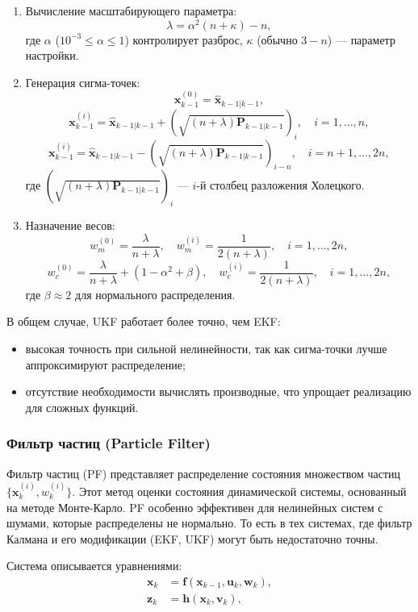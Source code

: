 \begin{enumerate}
    \item Вычисление масштабирующего параметра:
    \[
    \lambda = \alpha^2 (n + \kappa) - n,
    \]
    где \(\alpha\) (\(10^{-3} \leq \alpha \leq 1\)) контролирует разброс, \(\kappa\) (обычно \(3 - n\)) --- параметр настройки.
    \item Генерация сигма-точек:
    \[
    \mathbf{x}_{k-1}^{(0)} = \hat{\mathbf{x}}_{k-1|k-1},
    \]
    \[
    \mathbf{x}_{k-1}^{(i)} = \hat{\mathbf{x}}_{k-1|k-1} + (\sqrt{(n + \lambda) \mathbf{P}_{k-1|k-1}})_i, \quad i = 1, \dots, n,
    \]
    \[
    \mathbf{x}_{k-1}^{(i)} = \hat{\mathbf{x}}_{k-1|k-1} - (\sqrt{(n + \lambda) \mathbf{P}_{k-1|k-1}})_{i-n}, \quad i = n+1, \dots, 2n,
    \]
    где \((\sqrt{(n + \lambda) \mathbf{P}_{k-1|k-1}})_i\) --- \(i\)-й столбец разложения Холецкого.
    \item Назначение весов:
    \[
    w_m^{(0)} = \frac{\lambda}{n + \lambda}, \quad w_m^{(i)} = \frac{1}{2(n + \lambda)}, \quad i = 1, \dots, 2n,
    \]
    \[
    w_c^{(0)} = \frac{\lambda}{n + \lambda} + (1 - \alpha^2 + \beta), \quad w_c^{(i)} = \frac{1}{2(n + \lambda)}, \quad i = 1, \dots, 2n,
    \]
    где \(\beta \approx 2\) для нормального распределения.
\end{enumerate}

В общем случае, UKF работает более точно, чем EKF:
\begin{itemize}
    \item высокая точность при сильной нелинейности, так как сигма-точки лучше аппроксимируют распределение;
    \item отсутствие необходимости вычислять производные, что упрощает реализацию для сложных функций.
\end{itemize}

\subsubsection{Фильтр частиц (Particle Filter)}
\label{particle_filter}

Фильтр частиц (PF) представляет распределение состояния множеством частиц \(\{\mathbf{x}_k^{(i)}, w_k^{(i)}\}\). 
Этот метод оценки состояния динамической системы, основанный на методе Монте-Карло.
PF особенно эффективен для нелинейных систем с шумами, которые распределены не нормально.
То есть в тех системах, где фильтр Калмана и его модификации (EKF, UKF) могут быть недостаточно точны.

Система описывается уравнениями:
\begin{align}
    \mathbf{x}_k &= \mathbf{f}(\mathbf{x}_{k-1}, \mathbf{u}_k, \mathbf{w}_k), \label{eq:pf_state} \\
    \mathbf{z}_k &= \mathbf{h}(\mathbf{x}_k, \mathbf{v}_k), \label{eq:pf_meas}
\end{align}

